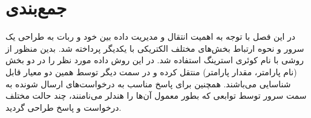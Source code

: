 \section{جمع‌بندی}

در این فصل با توجه به اهمیت انتقال و مدیریت داده بین خود و ربات به طراحی یک سرور و نحوه ارتباط بخش‌های مختلف الکتریکی با یکدیگر پرداخته شد. بدین منظور از روشی با نام کوئری استرینگ استفاده شد. در این روش داده مورد نظر را در دو بخش (نام پارامتر، مقدار پارامتر) منتقل کرده و در سمت دیگر توسط همین دو معیار قابل شناسایی می‌باشند. همچنین برای پاسخ مناسب به درخواست‌های ارسال شونده به سمت سرور توسط توابعی که بطور معمول آن‌ها را هندلر می‌نامنند، چند حالت مختلف درخواست و پاسخ طراحی گردید.